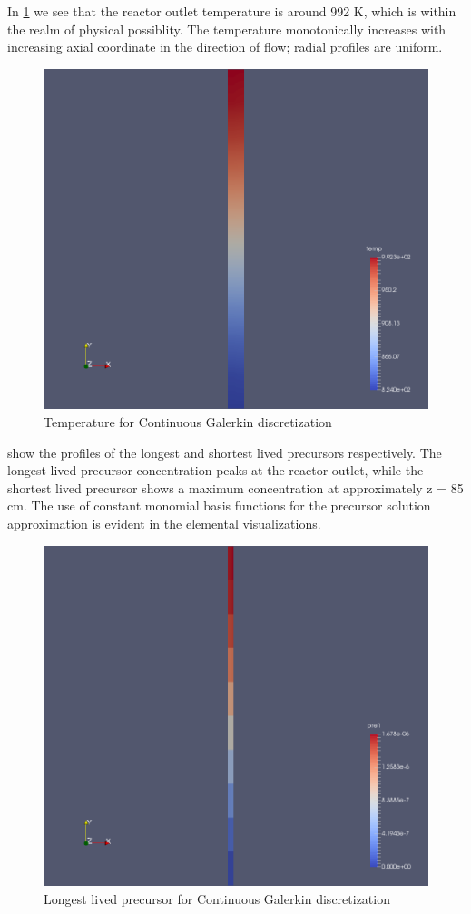 \documentclass{article}
\begin{document}
In \cref{fig:cg_temperature} we see that the reactor outlet temperature is
around 992 K, which is within the realm of physical possiblity. The temperature
monotonically increases with increasing axial coordinate in the direction of
flow; radial profiles are uniform.

\begin{figure}[htpb]
  \centering
  \includegraphics[width=.5\textwidth]{temperature.png}
  \caption{Temperature for Continuous Galerkin discretization}
  \label{fig:cg_temperature}
\end{figure}

 show the profiles of
the longest and shortest lived precursors respectively. The longest lived
precursor concentration peaks at the reactor outlet, while the shortest lived
precursor shows a maximum concentration at approximately z = 85 cm. The use of
constant monomial basis functions for the precursor solution approximation is
evident in the elemental visualizations.

\begin{figure}[htpb]
  \centering
  \includegraphics[width=.5\textwidth]{longest_lived_precursor.png}
  \caption{Longest lived precursor for Continuous Galerkin discretization}
  \label{fig:cg_longest_precursor}
\end{figure}
\end{document}
